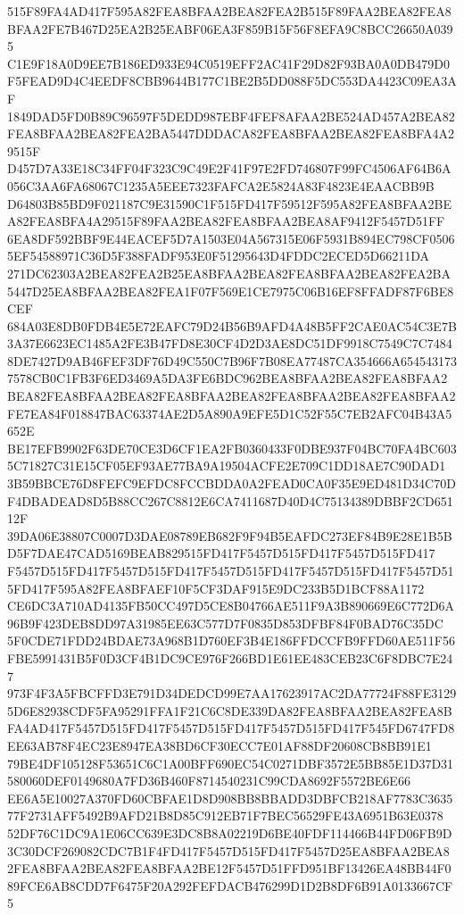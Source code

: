 \documentclass[UTF8,fontset=fandol,zihao=-4,a4paper]{ctexart}
\begin{document}
{{515F89FA4AD417F595A82FEA8BFAA2BEA82FEA2B515F89FAA2BEA82FEA8BFAA2FE7B467D25EA2B25EABF06EA3F859B15F56F8EFA9C8BCC26650A0395
C1E9F18A0D9EE7B186ED933E94C0519EFF2AC41F29D82F93BA0A0DB479D0F5FEAD9D4C4EEDF8CBB9644B177C1BE2B5DD088F5DC553DA4423C09EA3AF
1849DAD5FD0B89C96597F5DEDD987EBF4FEF8AFAA2BE524AD457A2BEA82FEA8BFAA2BEA82FEA2BA5447DDDACA82FEA8BFAA2BEA82FEA8BFA4A29515F
D457D7A33E18C34FF04F323C9C49E2F41F97E2FD746807F99FC4506AF64B6A056C3AA6FA68067C1235A5EEE7323FAFCA2E5824A83F4823E4EAACBB9B
D64803B85BD9F021187C9E31590C1F515FD417F59512F595A82FEA8BFAA2BEA82FEA8BFA4A29515F89FAA2BEA82FEA8BFAA2BEA8AF9412F5457D51FF
6EA8DF592BBF9E44EACEF5D7A1503E04A567315E06F5931B894EC798CF05065EF54588971C36D5F388FADF953E0F51295643D4FDDC2ECED5D66211DA
271DC62303A2BEA82FEA2B25EA8BFAA2BEA82FEA8BFAA2BEA82FEA2BA5447D25EA8BFAA2BEA82FEA1F07F569E1CE7975C06B16EF8FFADF87F6BE8CEF
684A03E8DB0FDB4E5E72EAFC79D24B56B9AFD4A48B5FF2CAE0AC54C3E7B3A37E6623EC1485A2FE3B47FD8E30CF4D2D3AE8DC51DF9918C7549C7C7484
8DE7427D9AB46FEF3DF76D49C550C7B96F7B08EA77487CA354666A6545431737578CB0C1FB3F6ED3469A5DA3FE6BDC962BEA8BFAA2BEA82FEA8BFAA2
BEA82FEA8BFAA2BEA82FEA8BFAA2BEA82FEA8BFAA2BEA82FEA8BFAA2FE7EA84F018847BAC63374AE2D5A890A9EFE5D1C52F55C7EB2AFC04B43A5652E
BE17EFB9902F63DE70CE3D6CF1EA2FB0360433F0DBE937F04BC70FA4BC6035C71827C31E15CF05EF93AE77BA9A19504ACFE2E709C1DD18AE7C90DAD1
3B59BBCE76D8FEFC9EFDC8FCCBDDA0A2FEAD0CA0F35E9ED481D34C70DF4DBADEAD8D5B88CC267C8812E6CA7411687D40D4C75134389DBBF2CD65112F
39DA06E38807C0007D3DAE08789EB682F9F94B5EAFDC273EF84B9E28E1B5BD5F7DAE47CAD5169BEAB829515FD417F5457D515FD417F5457D515FD417
F5457D515FD417F5457D515FD417F5457D515FD417F5457D515FD417F5457D515FD417F595A82FEA8BFAEF10F5CF3DAF915E9DC233B5D1BCF88A1172
CE6DC3A710AD4135FB50CC497D5CE8B04766AE511F9A3B890669E6C772D6A96B9F423DEB8DD97A31985EE63C577D7F0835D853DFBF84F0BAD76C35DC
5F0CDE71FDD24BDAE73A968B1D760EF3B4E186FFDCCFB9FFD60AE511F56FBE5991431B5F0D3CF4B1DC9CE976F266BD1E61EE483CEB23C6F8DBC7E247
973F4F3A5FBCFFD3E791D34DEDCD99E7AA17623917AC2DA77724F88FE31295D6E82938CDF5FA95291FFA1F21C6C8DE339DA82FEA8BFAA2BEA82FEA8B
FA4AD417F5457D515FD417F5457D515FD417F5457D515FD417F545FD6747FD8EE63AB78F4EC23E8947EA38BD6CF30ECC7E01AF88DF20608CB8BB91E1
79BE4DF105128F53651C6C1A00BFF690EC54C0271DBF3572E5BB85E1D37D31580060DEF0149680A7FD36B460F8714540231C99CDA8692F5572BE6E66
EE6A5E10027A370FD60CBFAE1D8D908BB8BBADD3DBFCB218AF7783C363577F2731AFF5492B9AFD21B8D85C912EB71F7BEC56529FE43A6951B63E0378
52DF76C1DC9A1E06CC639E3DC8B8A02219D6BE40FDF114466B44FD06FB9D3C30DCF269082CDC7B1F4FD417F5457D515FD417F5457D25EA8BFAA2BEA8
2FEA8BFAA2BEA82FEA8BFAA2BE12F5457D51FFD951BF13426EA48BB44F089FCE6AB8CDD7F6475F20A292FEFDACB476299D1D2B8DF6B91A0133667CF5
}}
\end{document}
